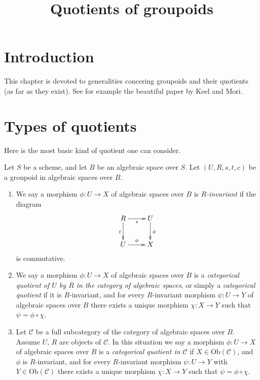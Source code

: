 

%


\title{Quotients of groupoids}


\maketitle

\label{section-phantom}

\tableofcontents

\section{Introduction}
\label{section-introduction}

\noindent
This chapter is devoted to generalities concering groupoids and their
quotients (as far as they exist).
See for example the beautiful paper \cite{K-M} by Keel and Mori.



\section{Types of quotients}
\label{section-types}

\noindent
Here is the most basic kind of quotient one can consider.

\begin{definition}
\label{definition-invariant}
Let $S$ be a scheme, and let $B$ be an algebraic space over $S$.
Let $(U, R, s, t, c)$ be a groupoid in algebraic spaces over $B$.
\begin{enumerate}
\item We say a morphism $\phi : U \to X$ of algebraic spaces over $B$ is
{\it $R$-invariant} if the diagram
$$
\xymatrix{
R \ar[r]_s \ar[d]_t & U \ar[d]^\phi \\
U \ar[r]^\phi & X
}
$$
is commutative.
\item We say a morphism $\phi : U \to X$ of algebraic spaces over $B$
is a {\it categorical quotient of $U$ by $R$ in the category of algebraic
spaces}, or simply a {\it categorical quotient} if it is $R$-invariant, and
for every $R$-invariant morphism $\psi : U \to Y$ of algebraic spaces over $B$
there exists a unique morphism $\chi : X \to Y$ such that
$\psi = \phi \circ \chi$.
\item Let $\mathcal{C}$ be a full subcategory of the category of algebraic
spaces over $B$. Assume $U$, $R$ are objects of $\mathcal{C}$.
In this situation we say
a morphism $\phi : U \to X$ of algebraic spaces over $B$
is a {\it categorical quotient in $\mathcal{C}$}
if $X \in \text{Ob}(\mathcal{C})$, and $\phi$ is $R$-invariant,
and for every $R$-invariant morphism
$\psi : U \to Y$ with $Y \in \text{Ob}(\mathcal{C})$
there exists a unique morphism $\chi : X \to Y$ such
that $\psi = \phi \circ \chi$.
\end{enumerate}
\end{definition}

